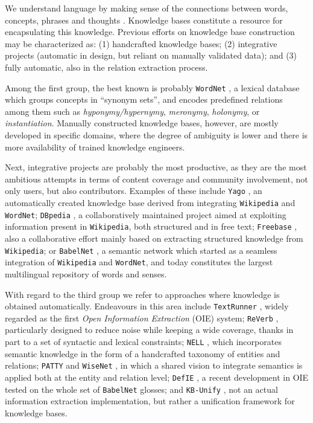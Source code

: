We understand language by making sense of the connections between words, concepts, phrases and thoughts \citep{Havasietal2007}. Knowledge bases constitute a resource for encapsulating this knowledge. Previous efforts on knowledge base construction may be characterized as: (1) handcrafted knowledge bases; (2) integrative projects (automatic in design, but reliant on manually validated data); and (3) fully automatic, also in the relation extraction process.

Among the first group, the best known is probably \texttt{WordNet} \citep{Miller1995}, a lexical database which groups concepts in ``synonym sets'', and encodes predefined relations among them such as \textit{hyponymy/hypernymy}, \textit{meronymy}, \textit{holonymy}, or \textit{instantiation}. Manually constructed knowledge bases, however, are mostly developed in specific domains, where the degree of ambiguity is lower and there is more availability of trained knowledge engineers.

Next, integrative projects are probably the most productive, as they are the most ambitious attempts in terms of content coverage and community involvement, not only users, but also contributors. Examples of these include \texttt{Yago} \citep{Suchaneketal2007}, an automatically created knowledge base derived from integrating \texttt{Wikipedia} and \texttt{WordNet}; \texttt{DBpedia} \citep{Lehmanetal2014}, a collaboratively maintained project aimed at exploiting information present in \texttt{Wikipedia}, both structured and in free text; \texttt{Freebase} \citep{Bollacketal2008}, also a collaborative effort mainly based on extracting structured knowledge from \texttt{Wikipedia}; or \texttt{BabelNet} \citep{NavigliPonzetto2012}, a semantic network which started as a seamless integration of \texttt{Wikipedia} and \texttt{WordNet}, and today constitutes the largest multilingual repository of words and senses.

With regard to the third group we refer to approaches where knowledge is obtained automatically. 
Endeavours in this area include \texttt{TextRunner} \citep{Bankoetal2007}, widely regarded as the first \textit{Open Information Extraction} (OIE) system; \texttt{ReVerb} \citep{Fader2011}, particularly designed to reduce noise while keeping a wide coverage, thanks in part to a set of syntactic and lexical constraints; \texttt{NELL} \citep{Carlson2010}, which incorporates semantic knowledge in the form of a handcrafted taxonomy of entities and relations; \texttt{PATTY} \citep{Nakasholeetal2012} and \texttt{WiseNet} \citep{MoroandNavigli2012,MoroandNavigli2013}, in which a shared vision to integrate semantics is applied both at the entity and relation level; \texttt{DefIE} \citep{DelliBovietal2015b}, a recent development in OIE tested on the whole set of \texttt{BabelNet} glosses; and \texttt{KB-Unify} \citep{DelliBovietal2015}, not an actual information extraction implementation, but rather a unification framework for knowledge bases.

